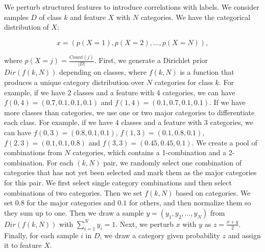 \documentclass{article}
\begin{document}
We perturb structured features to introduce correlations with labels. We consider samples $D$ of class $k$ and feature $X$ with $N$ categories. We have the categorical distribution of $X$: 

\begin{displaymath}
x = (p(X=1), p(X=2), ..., p(X=N)),
\end{displaymath}

\noindent where $p(X=j)=\frac{Count(j)}{|D|}$. First, we generate a Dirichlet prior $Dir(f(k,N))$ depending on classes, where $f(k,N)$ is a function that produces a unique category distribution over $N$ categories for class $k$. For example, if we have 2 classes and a feature with 4 categories, we can have $f(0,4)=(0.7,0.1,0.1,0.1)$ and $f(1,4)=(0.1,0.7,0.1,0.1)$. If we have more classes than categories, we use one or two major categories to differentiate each class. For example, if we have 4 classes and a feature with 3 categories, we can have $f(0,3)=(0.8,0.1,0.1)$, $f(1,3)=(0.1,0.8,0.1)$, $f(2,3)=(0.1,0.1,0.8)$ and $f(3,3)=(0.45,0.45,0.1)$. We create a pool of combinations from $N$ categories, which contains a 1-combination and a 2-combination. For each $(k,N)$ pair, we randomly select one combination of categories that has not yet been selected and mark them as the major categories for this pair. We first select single category combinations and then select combinations of two categories. Then we set $f(k,N)$ based on categories. We set $0.8$ for the major categories and $0.1$ for others, and then normalize them so they sum up to one. Then we draw a sample $y=(y_1,y_2,...,y_{N})$ from $Dir(f(k,N))$ with $\sum_{i=1}^{N} y_i = 1$. Next, we perturb $x$ with $y$ as $z = \frac{x+y}{2}$. Finally, for each sample $i$ in $D$, we draw a category given probability $z$ and assign it to feature $X$.






\end{document}
